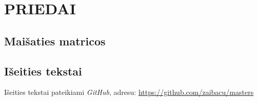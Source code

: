 \chapter{PRIEDAI}
\section{Maišaties matricos}
\renewcommand{\lstlistingname}{priedas}
  
   
   


\section{Išeities tekstai}

Išeities tekstai pateikiami \textit{GitHub}, adresu: \url{https://github.com/zaibacu/masters}



